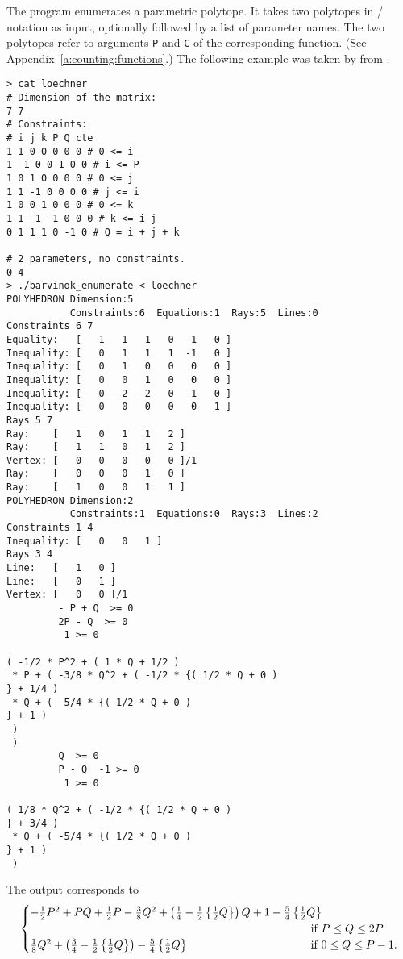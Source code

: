 The program  enumerates a
parametric polytope.  It takes two polytopes in \PolyLib/
notation as input, optionally followed by a list of parameter
names.
The two polytopes refer to arguments \verb+P+ and \verb+C+
of the corresponding function. (See Appendix~\ref{a:counting:functions}.)
The following example was taken by 
from .
\begin{verbatim}
> cat loechner 
# Dimension of the matrix: 
7 7 
# Constraints: 
# i j k P Q cte 
1 1 0 0 0 0 0 # 0 <= i 
1 -1 0 0 1 0 0 # i <= P 
1 0 1 0 0 0 0 # 0 <= j 
1 1 -1 0 0 0 0 # j <= i
1 0 0 1 0 0 0 # 0 <= k 
1 1 -1 -1 0 0 0 # k <= i-j 
0 1 1 1 0 -1 0 # Q = i + j + k

# 2 parameters, no constraints. 
0 4
> ./barvinok_enumerate < loechner 
POLYHEDRON Dimension:5
           Constraints:6  Equations:1  Rays:5  Lines:0
Constraints 6 7
Equality:   [   1   1   1   0  -1   0 ]
Inequality: [   0   1   1   1  -1   0 ]
Inequality: [   0   1   0   0   0   0 ]
Inequality: [   0   0   1   0   0   0 ]
Inequality: [   0  -2  -2   0   1   0 ]
Inequality: [   0   0   0   0   0   1 ]
Rays 5 7
Ray:    [   1   0   1   1   2 ]
Ray:    [   1   1   0   1   2 ]
Vertex: [   0   0   0   0   0 ]/1
Ray:    [   0   0   0   1   0 ]
Ray:    [   1   0   0   1   1 ]
POLYHEDRON Dimension:2
           Constraints:1  Equations:0  Rays:3  Lines:2
Constraints 1 4
Inequality: [   0   0   1 ]
Rays 3 4
Line:   [   1   0 ]
Line:   [   0   1 ]
Vertex: [   0   0 ]/1
         - P + Q  >= 0
         2P - Q  >= 0
          1 >= 0

( -1/2 * P^2 + ( 1 * Q + 1/2 )
 * P + ( -3/8 * Q^2 + ( -1/2 * {( 1/2 * Q + 0 )
} + 1/4 )
 * Q + ( -5/4 * {( 1/2 * Q + 0 )
} + 1 )
 )
 )
         Q  >= 0
         P - Q  -1 >= 0
          1 >= 0

( 1/8 * Q^2 + ( -1/2 * {( 1/2 * Q + 0 )
} + 3/4 )
 * Q + ( -5/4 * {( 1/2 * Q + 0 )
} + 1 )
 )
\end{verbatim}
The output corresponds to 
$$
\begin{cases}
\makebox[0pt][l]{$-\frac 1 2 P^2 + P Q + \frac 1 2 P - \frac 3 8 Q^2
+ \left( \frac 1 4 - \frac 1 2 \left\{ \frac 1 2 Q \right\} \right)
	       	Q + 1 
- \frac 5 4 \left\{ \frac 1 2 Q \right\}$} \\
&
\hbox{if $P \le Q \le 2 P$}
\\
\frac 1 8 Q^2 + 
\left( \frac 3 4 - \frac 1 2 \left\{ \frac 1 2 Q \right\} \right)
- \frac 5 4 \left\{ \frac 1 2 Q \right\}
\qquad
\qquad
\qquad
\qquad
\qquad
&
\hbox{if $0 \le Q \le P-1$}
.
\end{cases}
$$

